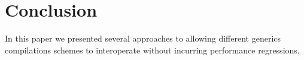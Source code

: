 \vspace{-0.5em}

\section{Conclusion}

In this paper we presented several approaches to allowing different generics compilations schemes to interoperate without incurring performance regressions.

\vspace{-0.5em}